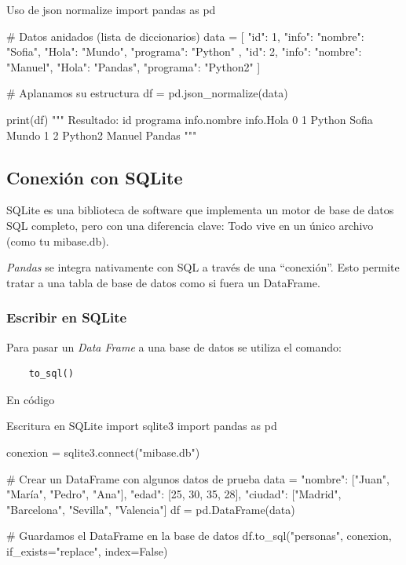 \begin{pycode}{Uso de json normalize}
import pandas as pd

# Datos anidados (lista de diccionarios)
data = [
{
"id": 1,
"info": {"nombre": "Sofia", "Hola": "Mundo"},
"programa": "Python"
},
{
"id": 2,
"info": {"nombre": "Manuel", "Hola": "Pandas"},
"programa": "Python2"
}
]

# Aplanamos su estructura
df = pd.json_normalize(data)

print(df)
"""
Resultado:
id   programa  info.nombre  info.Hola
0   1 Python         Sofia      Mundo
1   2 Python2       Manuel     Pandas
"""
\end{pycode}




\subsection{Conexión con SQLite}

SQLite es una biblioteca de software que implementa un motor de base de datos SQL completo, pero con una diferencia clave: Todo vive en un único archivo (como tu mibase.db).

\textit{Pandas} se integra nativamente con SQL a través de una ``conexión''. Esto permite tratar a una tabla de base de datos como si fuera un DataFrame.

\subsubsection{Escribir en SQLite}

Para pasar un \textit{Data Frame} a una base de datos se utiliza el comando:
\begin{verbatim}
    to_sql()
\end{verbatim}

En código
\begin{pycode}{Escritura en SQLite}
import sqlite3
import pandas as pd

conexion = sqlite3.connect("mibase.db")

# Crear un DataFrame con algunos datos de prueba
data = {
    "nombre": ["Juan", "María", "Pedro", "Ana"],
    "edad": [25, 30, 35, 28],
    "ciudad": ["Madrid", "Barcelona", "Sevilla", "Valencia"]
}
df = pd.DataFrame(data)

# Guardamos el DataFrame en la base de datos
df.to_sql("personas", conexion, if_exists="replace", index=False)
\end{pycode}

